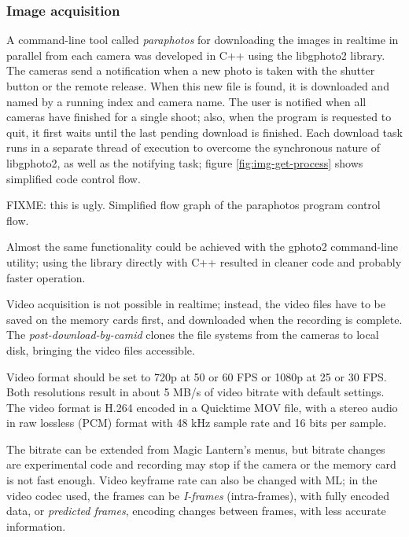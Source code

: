 \subsubsection{Image acquisition} %

A command-line tool called \emph{paraphotos} for downloading the images in realtime in parallel from each camera was developed in C++ using the libgphoto2 library.
The cameras send a notification when a new photo is taken with the shutter button or the remote release.
When this new file is found, it is downloaded and named by a running index and camera name.
The user is notified when all cameras have finished for a single shoot; also, when the program is requested to quit, it first waits until the last pending download is finished.
Each download task runs in a separate thread of execution to overcome the synchronous nature of libgphoto2, as well as the notifying task; figure \ref{fig:img-get-process} shows simplified code control flow.

{FIXME: this is ugly. Simplified flow graph of the paraphotos program control flow.}

Almost the same functionality could be achieved with the gphoto2 command-line utility; using the library directly with C++ resulted in cleaner code and probably faster operation.

Video acquisition is not possible in realtime; instead, the video files have to be saved on the memory cards first, and downloaded when the recording is complete.
The \emph{post-download-by-camid} clones the file systems from the cameras to local disk, bringing the video files accessible.

Video format should be set to 720p at 50 or 60 FPS or 1080p at 25 or 30 FPS.
Both resolutions result in about 5 MB/s of video bitrate with default settings.
The video format is H.264 encoded in a Quicktime MOV file, with a stereo audio in raw lossless (PCM) format with 48 kHz sample rate and 16 bits per sample.

The bitrate can be extended from Magic Lantern's menus, but bitrate changes are experimental code and recording may stop if the camera or the memory card is not fast enough.
Video keyframe rate can also be changed with ML;
in the video codec used, the frames can be \emph{I-frames} (intra-frames), with fully encoded data, or \emph{predicted frames}, encoding changes between frames, with less accurate information.


